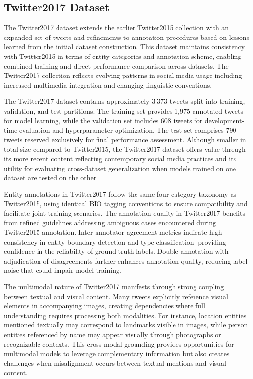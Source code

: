 \documentclass[12pt,a4paper]{report}
\begin{document}
\subsection{Twitter2017 Dataset}

The Twitter2017 dataset extends the earlier Twitter2015 collection with an expanded set of tweets and refinements to annotation procedures based on lessons learned from the initial dataset construction. This dataset maintains consistency with Twitter2015 in terms of entity categories and annotation scheme, enabling combined training and direct performance comparison across datasets. The Twitter2017 collection reflects evolving patterns in social media usage including increased multimedia integration and changing linguistic conventions.

The Twitter2017 dataset contains approximately 3,373 tweets split into training, validation, and test partitions. The training set provides 1,975 annotated tweets for model learning, while the validation set includes 608 tweets for development-time evaluation and hyperparameter optimization. The test set comprises 790 tweets reserved exclusively for final performance assessment. Although smaller in total size compared to Twitter2015, the Twitter2017 dataset offers value through its more recent content reflecting contemporary social media practices and its utility for evaluating cross-dataset generalization when models trained on one dataset are tested on the other.

Entity annotations in Twitter2017 follow the same four-category taxonomy as Twitter2015, using identical BIO tagging conventions to ensure compatibility and facilitate joint training scenarios. The annotation quality in Twitter2017 benefits from refined guidelines addressing ambiguous cases encountered during Twitter2015 annotation. Inter-annotator agreement metrics indicate high consistency in entity boundary detection and type classification, providing confidence in the reliability of ground truth labels. Double annotation with adjudication of disagreements further enhances annotation quality, reducing label noise that could impair model training.

The multimodal nature of Twitter2017 manifests through strong coupling between textual and visual content. Many tweets explicitly reference visual elements in accompanying images, creating dependencies where full understanding requires processing both modalities. For instance, location entities mentioned textually may correspond to landmarks visible in images, while person entities referenced by name may appear visually through photographs or recognizable contexts. This cross-modal grounding provides opportunities for multimodal models to leverage complementary information but also creates challenges when misalignment occurs between textual mentions and visual content.
\end{document}
